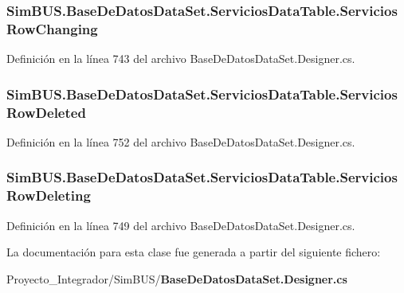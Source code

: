 \subsubsection[{Servicios\-Row\-Changing}]{ Sim\-B\-U\-S.\-Base\-De\-Datos\-Data\-Set.\-Servicios\-Data\-Table.\-Servicios\-Row\-Changing}\label{class_sim_b_u_s_1_1_base_de_datos_data_set_1_1_servicios_data_table_a05077a17e380c01b890058802a013eb6}


Definición en la línea 743 del archivo Base\-De\-Datos\-Data\-Set.\-Designer.\-cs.

\subsubsection[{Servicios\-Row\-Deleted}]{ Sim\-B\-U\-S.\-Base\-De\-Datos\-Data\-Set.\-Servicios\-Data\-Table.\-Servicios\-Row\-Deleted}\label{class_sim_b_u_s_1_1_base_de_datos_data_set_1_1_servicios_data_table_a6dffc990c8c6b415113f2ad995c5f0ae}


Definición en la línea 752 del archivo Base\-De\-Datos\-Data\-Set.\-Designer.\-cs.

\subsubsection[{Servicios\-Row\-Deleting}]{ Sim\-B\-U\-S.\-Base\-De\-Datos\-Data\-Set.\-Servicios\-Data\-Table.\-Servicios\-Row\-Deleting}\label{class_sim_b_u_s_1_1_base_de_datos_data_set_1_1_servicios_data_table_ae4acd2be18f4d1d9fc267a19d59e2d78}


Definición en la línea 749 del archivo Base\-De\-Datos\-Data\-Set.\-Designer.\-cs.



La documentación para esta clase fue generada a partir del siguiente fichero\-:\begin{DoxyCompactItemize}
\item 
Proyecto\-\_\-\-Integrador/\-Sim\-B\-U\-S/{\bf Base\-De\-Datos\-Data\-Set.\-Designer.\-cs}\end{DoxyCompactItemize}
